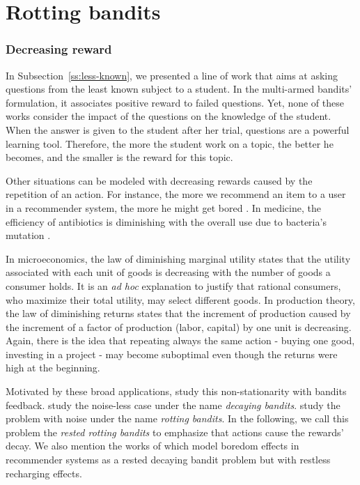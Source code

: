 \part{Rotting bandits}
\section*{Decreasing reward}
In Subsection~\ref{ss:less-known}, we presented a line of work that aims at asking questions from the least known subject to a student. In the multi-armed bandits' formulation, it associates positive reward to failed questions. Yet, none of these works consider the impact of the questions on the knowledge of the student. When the answer is given to the student after her trial, questions are a powerful learning tool. Therefore, the more the student work on a topic, the better he becomes, and the smaller is the reward for this topic.

Other situations can be modeled with decreasing rewards caused by the repetition of an action. For instance, the more we recommend an item to a user in a recommender system, the more he might get bored \citep{warlop2018fighting}. In medicine, the efficiency of antibiotics is diminishing with the overall use due to bacteria's mutation \citep{ventola2015antibiotic, ventola2015antibiotic2}.

In microeconomics, the law of diminishing marginal utility states that the utility associated with each unit of goods is decreasing with the number of goods a consumer holds. It is an \emph{ad hoc} explanation to justify that rational consumers, who maximize their total utility, may select different goods. In production theory, the law of diminishing returns \citep{canan1892origin} states that the increment of production caused by the increment of a factor of production (labor, capital) by one unit is decreasing. Again, there is the idea that repeating always the same action - buying one good, investing in a project - may become suboptimal even though the returns were high at the beginning. 

Motivated by these broad applications, \citet{heidari2016tight, levine2017rotting} study this non-stationarity with bandits feedback.  \citet{heidari2016tight} study the noise-less case under the name \emph{decaying bandits}. \citet{levine2017rotting} study the problem with noise under the name \emph{rotting bandits}. In the following, we call this problem the \emph{rested rotting bandits} to emphasize that actions cause the rewards' decay. We also mention the works of \citet{warlop2018fighting, immorlica2018recharging, pikeburke2019recovering} which model boredom effects in recommender systems as a rested decaying bandit problem but with restless recharging effects. 

